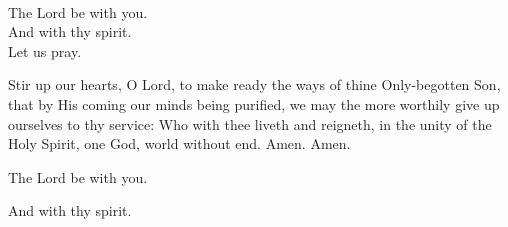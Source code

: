 \\
  \rubric{\Vbar}The Lord be with you.
\\
  \rubric{\Rbar}And with thy spirit.
\\
Let us pray.

Stir up our hearts, O Lord, to make ready the ways of thine Only-begotten Son, that by His coming our minds being purified, we may the more worthily give up ourselves to thy service: Who with thee liveth and reigneth, in the unity of the Holy Spirit, one God, world without end. Amen.\rubric{\Rbar} Amen.

  \rubric{\Vbar}The Lord be with you.

  \rubric{\Rbar}And with thy spirit.
